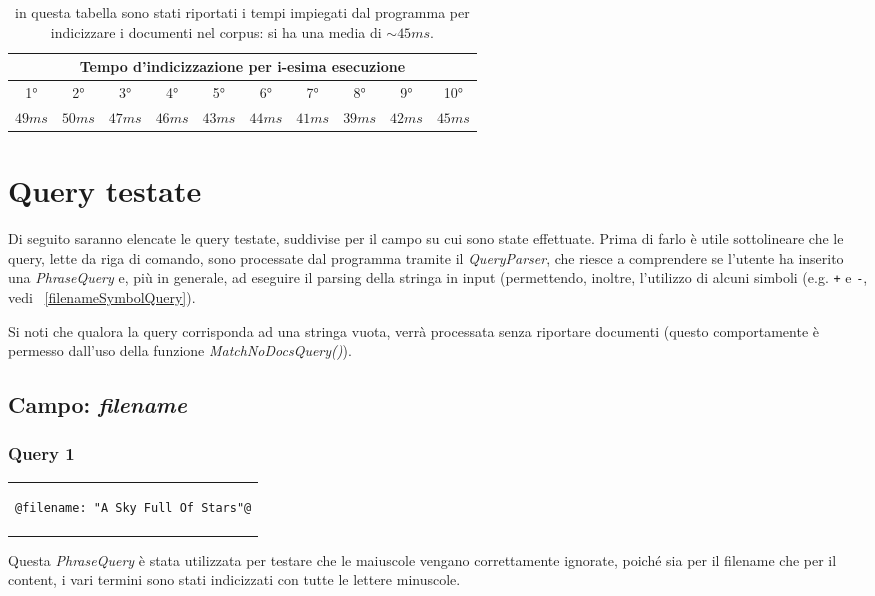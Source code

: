 \documentclass{article}
\begin{document}
\begin{table}[h]
\centering
    \begin{tabular}{|c|c|c|c|c|c|c|c|c|c|}
    \hline
    \multicolumn{10}{|c|}{Tempo d'indicizzazione per i-esima esecuzione}\\
    \hline
    1° & 2° & 3° & 4° & 5° & 6° & 7° & 8° & 9° & 10° \\
    \hline
        $49ms$ & $50ms$ & $47ms$ & $46ms$ & $43ms$ & $44ms$ & $41ms$ & $39ms$ & $42ms$ & $45ms$ \\
    \hline
    \end{tabular}
    \caption{in questa tabella sono stati riportati i tempi impiegati dal programma per indicizzare i documenti nel corpus: si ha una media di $\sim{45ms}$.}
\end{table}

\section{Query testate}
Di seguito saranno elencate le query testate, suddivise per il campo su cui sono state effettuate. Prima di farlo è utile sottolineare che le query, lette da riga di comando, sono processate dal programma tramite il \textit{\textit{QueryParser}}, che riesce a comprendere se l'utente ha inserito una \textit{\textit{PhraseQuery}} e, più in generale, ad eseguire il parsing della stringa in input (permettendo, inoltre, l'utilizzo di alcuni simboli (e.g. \verb|+| e \verb|-|, vedi ~\ref{filenameSymbolQuery}).

Si noti che qualora la query corrisponda ad una stringa vuota, verrà processata senza riportare documenti (questo comportamente è permesso dall'uso della funzione \textit{MatchNoDocsQuery()}).

\subsection{Campo: \textit{filename}} \label{filenameFieldQuery}

\subsubsection{Query 1}
\begin{center}
\begin{tabular}{c}
\begin{lstlisting}[style=prompt]
    @filename: "A Sky Full Of Stars"@
\end{lstlisting}
\end{tabular}    
\end{center}
Questa \textit{PhraseQuery} è stata utilizzata per testare che le maiuscole vengano correttamente ignorate, poiché sia per il filename che per il content, i vari termini sono stati indicizzati con tutte le lettere minuscole.
\end{document}
